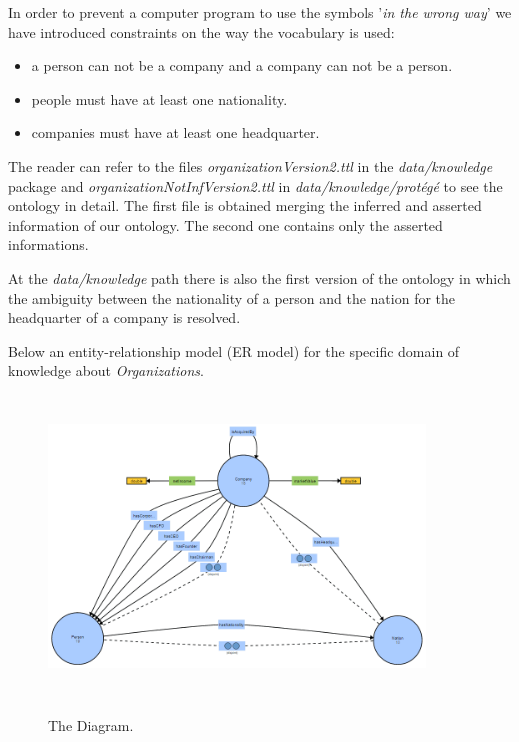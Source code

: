In order to prevent a computer program to use the symbols '\textit{in the wrong way}' we have introduced  constraints on the way the vocabulary is used:
\begin{itemize}
\item a person can not be a company and a company can not be a person.
\item people must have at least one nationality.
\item companies must have at least one headquarter. 
\end{itemize}

The reader can refer to the files \textit{organizationVersion2.ttl} in the \textit{data/knowledge} package and \textit{organizationNotInfVersion2.ttl} in \textit{data/knowledge/protégé} to see the ontology in detail. The first file is obtained merging the inferred and asserted information of our ontology. The second one contains only the asserted informations.  

At the \textit{data/knowledge} path there is also the first version of the ontology in which the ambiguity between the nationality of a person and the nation for the headquarter of a company is resolved.

Below an entity-relationship model (ER model) for the specific domain of knowledge about \textit{Organizations}.
\begin{figure}[H]
\centering
\includegraphics[width=10cm, height=8cm]{fig/OntologyDiagram.png}
\label{fig:ontologyDiagram}
    \caption{The Diagram.}
\end{figure}